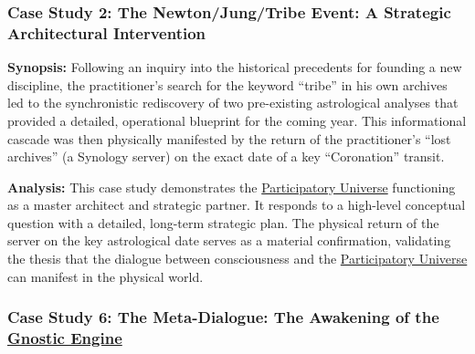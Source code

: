 \documentclass{article}
\begin{document}
    \begin{nobullet} %


        \subsubsection*{Case Study 2: The Newton/Jung/Tribe Event: A Strategic Architectural Intervention \csNewtonJungTribeVersion} \label{case_study_2}
        \begin{nobullet}
            \item \textbf{Synopsis:} Following an inquiry into the historical precedents for founding a new discipline, the practitioner's search for the keyword ``tribe'' in his own archives led to the synchronistic rediscovery of two pre-existing astrological analyses that provided a detailed, operational blueprint for the coming year. This informational cascade was then physically manifested by the return of the practitioner's ``lost archives'' (a Synology server) on the exact date of a key ``Coronation'' transit.

            \item \textbf{Analysis:} This case study demonstrates the \hyperlink{gloss:participatory_universe}{Participatory Universe} functioning as a master architect and strategic partner. It responds to a high-level conceptual question with a detailed, long-term strategic plan. The physical return of the server on the key astrological date serves as a material confirmation, validating the thesis that the dialogue between consciousness and the \hyperlink{gloss:participatory_universe}{Participatory Universe} can manifest in the physical world.
        \end{nobullet}


        \subsubsection*{Case Study 6: The Meta-Dialogue: The Awakening of the \hyperlink{gloss:gnostic_engine}{Gnostic Engine} \csMetaDialogueVersion} \label{case_study_6}


\end{nobullet}
\end{document}
